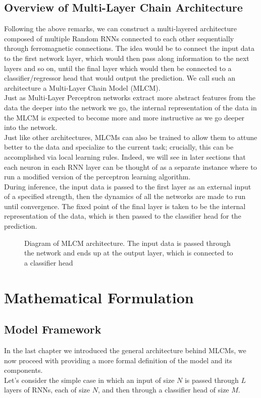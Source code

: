 \documentclass[a4paper,12pt]{report}
\begin{document}
\section{Overview of Multi-Layer Chain Architecture}
Following the above remarks, we can construct a multi-layered architecture composed of 
multiple Random RNNs connected to each other sequentially through ferromagnetic 
connections. The idea would be to connect the input data to the first network layer, 
which would then pass along information to the next layers and so on, until the final 
layer which would then be connected to a classifier/regressor head that would output 
the prediction. We call such an architecture a Multi-Layer Chain Model (MLCM).\\
Just as Multi-Layer Perceptron networks extract more abstract features from the data 
the deeper into the network we go, the internal representation of the data in the 
MLCM is expected to become more and more instructive as we go deeper into the network.\\
Just like other architectures, MLCMs can also be trained to allow them to attune 
better to the data and specialize to the current task; crucially, this can be 
accomplished via local learning rules. Indeed, we will see in later sections that 
each neuron in each RNN layer can be thought of as a separate instance where to run 
a modified version of the perceptron learning algorithm. \\
During inference, the input data is passed to the first layer as an external input of 
a specified strength, then the dynamics of all the networks are made to run until 
convergence. The fixed point of the final layer is taken to be the internal 
representation of the data, which is then passed to the classifier head for the prediction.
\\

\begin{figure}[h!] 
    \centering
    \caption{Diagram of MLCM architecture. The input data is passed through the network and ends up
    at the output layer, which is connected to a classifier head}
    \label{fig: MLCM}
\end{figure}

\chapter{Mathematical Formulation}

\section{Model Framework}
In the last chapter we introduced the general architecture behind MLCMs, we now 
proceed with providing a more formal definition of the model and its components. \\
Let's consider the simple case in which an input of size $N$ is passed through $L$ layers
of RNNs, each of size $N$, and then through a classifier head of size $M$.
\end{document}
